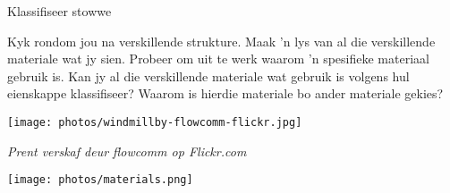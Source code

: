 \begin{activity}{Klassifiseer stowwe} {
\begin{minipage}{.4\textwidth}
Kyk rondom jou na verskillende strukture. Maak 'n lys van al die verskillende materiale wat jy sien. Probeer om uit te werk waarom 'n spesifieke materiaal gebruik is. Kan jy al die verskillende materiale wat gebruik is volgens hul eienskappe klassifiseer? Waarom is hierdie materiale bo ander materiale gekies?
\end{minipage}
\begin{minipage}{.3\textwidth}
\begin{center}
 \texttt{[image: photos/windmillby-flowcomm-flickr.jpg]}\par
\textit{Prent verskaf deur flowcomm op Flickr.com}
\end{center}
\end{minipage}
\begin{minipage}{.3\textwidth}
\begin{center}
 \texttt{[image: photos/materials.png]}\par
\end{center}
\end{minipage}
}
\end{activity}


\label{m38708*cid2}
